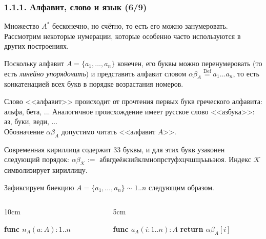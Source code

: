 \documentclass[mathserif,12pt,aspectratio=169]{beamer}
\def\emразделенной{\em разделенной}
\def\em#1{\it\color{blue}#1}
\def\Assign{\operatorname{:=}}
\def\Def{\stackrel{\text{Def}}{=}}
\def\Tuple#1#2#3{{#1}_{#2},\dots,{#1}_{#3}}
\let\cal\mathcal
\begin{document}
\begin{frame}
\frametitle{1.1.1. Алфавит, слово и язык (6/9)}
Множество $A^*$ бесконечно, но счётно, то есть 
его можно занумеровать. Рассмотрим некоторые нумерации, которые особенно часто используются
в других построениях.

Поскольку алфавит $A=\{\Tuple{a}{1}{n}\}$ конечен,
его буквы можно перенумеровать (то есть 
{\em линейно упорядочить}) и представить алфавит словом 
$\alpha\!\beta_A\Def a_1\dots a_{n}$,
то есть конкатенацией всех букв в порядке
возрастания номеров.


\begin{digress}
Слово <<алфавит>> происходит от прочтения
первых букв греческого алфавита:
альфа, бета, ... Аналогичное происхождение
имеет русское слово <<азбука>>: аз, буки, веди, ... \\Обозначение $\alpha\!\beta_A$ допустимо читать <<алфавит $A$>>.
\end{digress}

\begin{example}
Современная кириллица содержит 33 буквы,
и для этих букв узаконен следующий порядок:
$\alpha\!\beta_{\cal{K}}\Assign$ абвгдеёжзийклмнопрстуфхцчшщъыьэюя. 
Индекс $\cal{K}$ символизирует кириллицу.
\end{example}

Зафиксируем биекцию
$A=\{\Tuple{a}{1}{n}\} \sim 1..n$ следующим образом.

\vspace{-16pt}
\begin{columns}[t]
\begin{column}{10cm}
\begin{algorithmic}
\STATE \textbf{func $n_A(a : A) : 1..n$}
\ENDFOR
\end{algorithmic}
\end{column}    
\begin{column}{5cm}
\begin{algorithmic}
\STATE \textbf{func $a_A(i : 1..n) : A$}
\STATE \textbf{return $\alpha\!\beta_A[i]$}
\end{algorithmic}
\end{column}
\end{columns}    


\end{frame}
\end{document}
